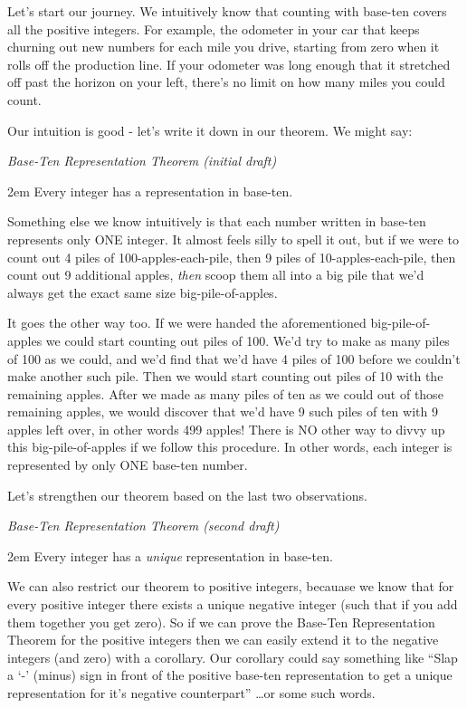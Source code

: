 \documentclass{article}
\newenvironment{jprIn}{\begin{adjustwidth}{2em}{}}{\end{adjustwidth}}
\begin{document}
\break
Let's start our journey. We intuitively know that counting with
base-ten covers all the positive integers.
For example, the odometer in your car that keeps churning out
new numbers for each mile you drive, starting from zero when it rolls
off the production line.  If your odometer was long enough that it 
stretched off past the horizon on your left, there's no limit on
how many miles you could count.

Our intuition is good - let's write it down
in our theorem. We might say:

\emph{Base-Ten Representation Theorem (initial draft)}
\begin{jprIn}
Every integer has a representation in base-ten.
\end{jprIn}

\bigskip
Something else we know intuitively is that each number written
in base-ten represents only ONE integer.
It almost feels silly to spell it out, but if we were to count out
4 piles of 100-apples-each-pile, then 9 piles of 10-apples-each-pile,
then count out 9 additional apples, \emph{then}
scoop them all into a big pile that
we'd always get the exact same size big-pile-of-apples.

It goes the other way too. If we were handed the aforementioned
big-pile-of-apples we could start counting out
piles of 100. We'd try to make as many piles of 100 as we could,
and we'd find that we'd have 4 piles of 100 before
we couldn't make another such pile.
Then we would start counting out piles of 10 with the remaining apples.
After we made as many piles of ten as we could out of those remaining apples,
we would discover that we'd have 9 such piles of ten
with 9 apples left over, in other words 499 apples! There is NO other
way to divvy up this big-pile-of-apples
if we follow this procedure.  In other words, each integer is
represented by only ONE base-ten number.

Let's strengthen our theorem based on the last two observations.

\emph{Base-Ten Representation Theorem (second draft)}
\begin{jprIn}
Every integer has a \emph{unique} representation in base-ten.
\end{jprIn}

\bigskip
We can also restrict our theorem to positive integers, becauase
we know that for every positive integer
there exists a unique negative integer
(such that if you add them together you get zero).
So if we can prove the
Base-Ten Representation Theorem for the positive integers then we
can easily extend it to the negative integers (and zero) with a corollary.
Our corollary could say something like ``Slap a `-' (minus)
sign in front of the positive base-ten representation to 
get a unique representation for
it's negative counterpart'' \dots{}or some such words.
\end{document}
